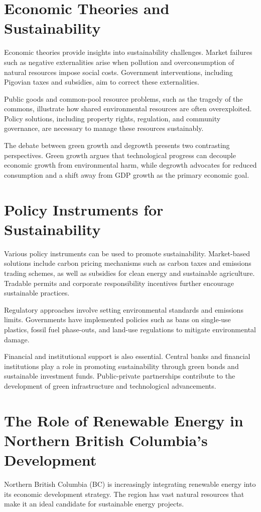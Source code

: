\documentclass[12pt]{article}
\begin{document}
\section{Economic Theories and Sustainability}
Economic theories provide insights into sustainability challenges. Market failures such as negative externalities arise when pollution and overconsumption of natural resources impose social costs. Government interventions, including Pigovian taxes and subsidies, aim to correct these externalities. 

Public goods and common-pool resource problems, such as the tragedy of the commons, illustrate how shared environmental resources are often overexploited. Policy solutions, including property rights, regulation, and community governance, are necessary to manage these resources sustainably.

The debate between green growth and degrowth presents two contrasting perspectives. Green growth argues that technological progress can decouple economic growth from environmental harm, while degrowth advocates for reduced consumption and a shift away from GDP growth as the primary economic goal.

\section{Policy Instruments for Sustainability}
Various policy instruments can be used to promote sustainability. Market-based solutions include carbon pricing mechanisms such as carbon taxes and emissions trading schemes, as well as subsidies for clean energy and sustainable agriculture. Tradable permits and corporate responsibility incentives further encourage sustainable practices.

Regulatory approaches involve setting environmental standards and emissions limits. Governments have implemented policies such as bans on single-use plastics, fossil fuel phase-outs, and land-use regulations to mitigate environmental damage.

Financial and institutional support is also essential. Central banks and financial institutions play a role in promoting sustainability through green bonds and sustainable investment funds. Public-private partnerships contribute to the development of green infrastructure and technological advancements.

\section{The Role of Renewable Energy in Northern British Columbia's Development}
Northern British Columbia (BC) is increasingly integrating renewable energy into its economic development strategy. The region has vast natural resources that make it an ideal candidate for sustainable energy projects. 
\end{document}
